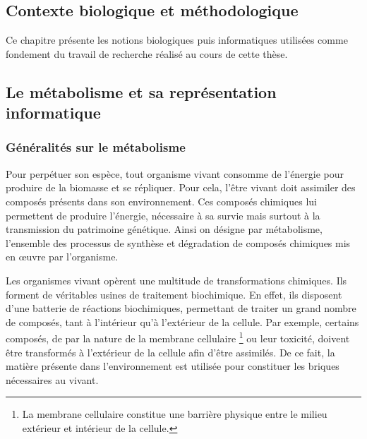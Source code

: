 \begin{refsegment}
	\chapter{Contexte biologique et méthodologique}

    Ce chapitre présente les notions biologiques puis informatiques utilisées comme fondement du travail de recherche réalisé au cours de cette thèse.
    
    
    \section{Le métabolisme et sa représentation informatique}
    \subsection{Généralités sur le métabolisme}
    
    Pour perpétuer son espèce, tout organisme vivant consomme de l'énergie pour produire de la biomasse et se répliquer. Pour cela, l'être vivant doit assimiler des composés présents dans son environnement. Ces composés chimiques lui permettent de produire l'énergie, nécessaire à sa survie mais surtout à la transmission du patrimoine génétique. Ainsi on désigne par métabolisme, l'ensemble des processus de synthèse et dégradation de composés chimiques mis en œuvre par l'organisme. 
    
    
    Les organismes vivant opèrent une multitude de transformations chimiques. Ils forment de véritables usines de traitement biochimique. En effet, ils disposent d'une batterie de réactions biochimiques, permettant de traiter un grand nombre de composés, tant à l'intérieur qu'à l'extérieur de la cellule. Par exemple, certains composés, de par la nature de la membrane cellulaire \footnote{La membrane cellulaire constitue une barrière physique entre le milieu extérieur et intérieur de la cellule.} ou leur toxicité, doivent être transformés à l'extérieur de la cellule afin d'être assimilés. De ce fait, la matière présente dans l'environnement est utilisée pour constituer les briques nécessaires au vivant.
    

\end{refsegment}
